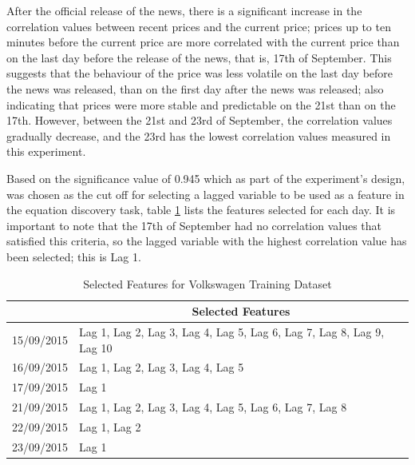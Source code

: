 \documentclass[13pt]{report}
\begin{document}
After the official release of the news, there is a significant increase in the correlation values between recent prices and the current price; prices up to ten minutes before the current price are more correlated with the current price than on the last day before the release of the news, that is, 17th of September. This suggests that the behaviour of the price was less volatile on the last day before the news was released, than on the first day after the news was released; also indicating that prices were more stable and predictable on the 21st than on the 17th. However, between the 21st and 23rd of September, the correlation values gradually decrease, and the 23rd has the lowest correlation values measured in this experiment.

Based on the significance value of 0.945 which as part of the experiment's design, was chosen as the cut off for selecting a lagged variable to be used as a feature in the equation discovery task, table \ref{selectedfeaturestab} lists the features selected for each day. It is important to note that the 17th of September had no correlation values that satisfied this criteria, so the lagged variable with the highest correlation value has been selected; this is Lag 1.

\begin{table}[H]
\centering
\begin{tabular}{|l|l|}
\hline
           & \multicolumn{1}{c|}{Selected Features}                                \\ \hline
15/09/2015 & Lag 1, Lag 2, Lag 3, Lag 4, Lag 5, Lag 6, Lag 7, Lag 8, Lag 9, Lag 10 \\ \hline
16/09/2015 & Lag 1, Lag 2, Lag 3, Lag 4, Lag 5                                     \\ \hline
17/09/2015 & Lag 1                                                                 \\ \hline
21/09/2015 & Lag 1, Lag 2, Lag 3, Lag 4, Lag 5, Lag 6, Lag 7, Lag 8                \\ \hline
22/09/2015 & Lag 1, Lag 2                                                          \\ \hline
23/09/2015 & Lag 1                                                                 \\ \hline
\end{tabular}
\caption{Selected Features for Volkswagen Training Dataset}
\label{selectedfeaturestab}
\end{table}
\end{document}
